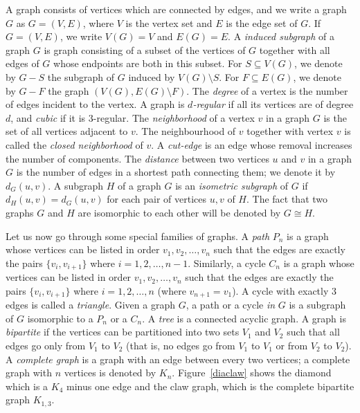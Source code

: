 \documentclass[12pt,a4paper,titlepage,openany]{report}
\begin{document}
 A graph consists of vertices which are connected by edges, and we write a graph $G$ as $G=(V,E)$, where $V$ is the vertex set and $E$ is the edge set of $G$. If $G=(V,E)$, we write $V(G)=V$ and $E(G)=E$.
 A \emph{induced subgraph} of a graph $G$ is graph consisting of a subset of the vertices of $G$ together with all edges of $G$ whose endpoints are both in this subset. For $S\subseteq V(G)$, we denote by $G-S$ the subgraph of $G$ induced by $V(G)\setminus  S$. For $F\subseteq E(G)$, we denote by $G-F$ the graph $(V(G), E(G)\setminus  F)$. The \emph{degree} of a vertex is the number of edges incident to the vertex. A graph is \emph{$d$-regular} if all its vertices are of degree $d$, and \emph{cubic} if it is $3$-regular. The \emph{neighborhood} of a vertex $v$ in a graph $G$ is the set of all vertices adjacent to $v$. The neighbourhood of $v$ together with vertex $v$ is called the \emph{closed neighborhood} of $v$. A \emph{cut-edge} is an edge whose removal increases the number of components. The \emph{distance} between two vertices $u$ and $v$ in a graph $G$ is the number of edges in a shortest path connecting them; we denote it by $d_G(u,v)$. A subgraph $H$ of a graph $G$ is an \emph{isometric subgraph} of $G$ if $d_H(u,v)=d_G(u, v)$ for each pair of vertices $u, v$ of $H$. The fact that two graphs $G$ and $H$ are isomorphic to each other will be denoted by $G\cong H$.

 Let us now go through some special families of graphs. A \emph{path} $P_n$ is a graph whose vertices can be listed in order $v_1, v_2,\ldots, v_n$ such that the edges are exactly the pairs $\{v_i, v_{i+1}\}$ where $i = 1, 2,\ldots, n-1$.
 Similarly, a cycle $C_n$ is a graph whose vertices can be listed in order $v_1, v_2,\ldots, v_n$ such that the edges are exactly the pairs $\{v_i, v_{i+1}\}$ where $i = 1, 2,\ldots, n$ (where $v_{n+1} = v_1$). A cycle with exactly 3 edges is called a \emph{triangle}. Given a graph $G$, a path or a cycle \emph{in} $G$ is a subgraph of $G$ isomorphic to a $P_n$ or a $C_n$.
  A \emph{tree} is a connected acyclic graph. A graph is \emph{bipartite} if the vertices can be partitioned into two sets $V_1$ and $V_2$ such that all edges go only from $V_1$ to $V_2$ (that is, no edges go from $V_1$ to $V_1$ or from $V_2$ to $V_2$). A \emph{complete graph} is a graph with an edge between every two vertices; a complete graph with $n$ vertices is denoted by $K_n$. Figure~\ref{diaclaw} shows the diamond which is a $K_4$ minus one edge and the claw graph, which is the complete bipartite graph $K_{1,3}$.
\end{document}
